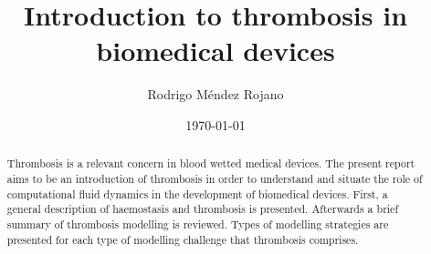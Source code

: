 \documentclass[%
 nofootinbib,
 amsmath,amssymb,
 aps,
 pra,
]{revtex4-1}
\begin{document}
\title{Introduction to thrombosis in biomedical devices}%
\author{Rodrigo M\'{e}ndez Rojano}
%
\date{\today}%
\begin{abstract}
Thrombosis is a relevant concern in blood wetted medical devices. The present report aims to be an introduction of thrombosis in order to understand and situate the role of computational fluid dynamics in the development of biomedical devices. First, a general description of haemostasis and thrombosis is presented. Afterwards a brief summary of thrombosis modelling is reviewed. Types of modelling strategies are presented for each type of modelling challenge that thrombosis comprises.  
\end{abstract}
\maketitle
\tableofcontents
\pagebreak
\printnomenclature
\end{document}
